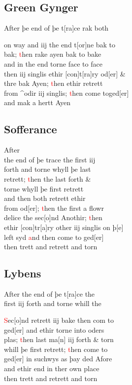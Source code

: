 \documentclass[12pt,letter]{article} %
\newcommand{\red}[1]{\textcolor{red}{#1}}
\newcommand{\srcpg}[1]{
    \noindent{
        \color{Gray}{\rule[0.5ex]{\linewidth}{1pt}~#1} 
    
    }
}
\begin{document}
\subsection{Green Gynger}
After þe end of þe t{[}ra{]}ce rak both
\srcpg{63}
on way and iij the end t{[}or{]}ne bak to\\
bak; \red{t}hen rake ayen bak to bake\\
and in the end torne face to face\\
then iij singlis ethir {[}con{]}t{[}ra{]}ry od{[}er{]} \&\\
thre bak Ayen; \red{t}hen ethir retrett\\
from \^{}odir iij singlis; \red{t}hen come toged{[}er{]}\\
and mak a hertt Ayen

\subsection{Sofferance}
After\\
the end of þe trace the first iij\\
forth and torne whyll þe last \\
retrett; \red{t}hen the last forth \&\\ 
torne whyll þe first retrett\\
and then both retrett ethir\\
from od{[}er{]}; \red{t}hen the first a flowr\\
delice the sec{[}o{]}nd Anothir; \red{t}hen\\
ethir {[}con{]}tr{[}a{]}ry other iij singlis on þ{[}e{]}\\
left syd \red{a}nd then come to ged{[}er{]}\\
then trett and retrett and torn

\subsection{Lybens}
After the end of þe t{[}ra{]}ce the\\
first iij forth and torne whill the
\srcpg{64}
\red{S}ec{[}o{]}nd retrett iij bake then com to\\
ged{[}er{]} and ethir torne into oders\\
plas; \red{t}hen last ma{[}n{]} iij forth \& torn\\
whill þe first retrett; \red{t}hen come to\\
ged{[}er{]} in suchwys as þay ded Afore\\
and ethir end in ther own place\\
then trett and retrett and torn
\end{document}
